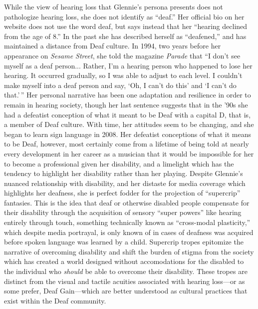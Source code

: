 \documentclass[12pt,letterpaper]{article}
\begin{document}
	While the view of hearing loss that Glennie's persona presents 
	does not pathologize hearing loss, she does not identify as ``deaf.'' 
	Her official bio
	on her website does not use the word deaf, but says instead that her 
	``hearing declined from the age of 8.'' In the past she has described 
	herself as ``deafened,'' and has maintained a distance from Deaf 
	culture. In 1994, two years before her appearance on 
	\textit{Sesame Street}, she told the magazine \textit{Parade} that 
	``I don't see
	myself as a deaf person... Rather, I'm a hearing person who happened to
	lose her hearing. It occurred gradually, so I was able to adjust to 
	each level. I couldn't make myself into a deaf person and say, `Oh, I 
	can't do this' and `I can't do that.'\,'' Her personal narrative has 
	been one adaptation and resilience in order to remain in hearing 
	society, though her last sentence suggests that in the '90s she had a 
	defeatist conception of what it meant to be Deaf with a capital D, 
	that is, a member of Deaf culture. With time, her
	attitudes seem to be changing, and she began to learn sign language in 
	2008.\autocite[186]{Holmes} Her defeatist conceptions of what it means 
	to be Deaf,  
	however, most certainly come from a lifetime of being told at nearly 
	every development in her career as a musician that it would be 
	impossible for her to become a professional given her disability, and
	a limelight which has the tendency to highlight her disability rather 
	than her playing. Despite 
	Glennie's nuanced relationship with disability, and her distaste for 
	media coverage which highlights her deafness, she is perfect fodder for 
	the projection of ``supercrip'' fantasies. This is the idea that deaf 	
	or otherwise disabled people compensate for their disability through the
	acquisition of sensory ``super powers'' like hearing entirely through 
	touch, something technically known as ``cross-modal plasticity,'' which 
	despite media portrayal, is only known of in cases of deafness was 
	acquired before spoken language was learned by a child. Supercrip 
	tropes epitomize the narrative of overcoming 
	disability and shift the burden of stigma from the society which has 
	created a world designed without accomodations for the disabled to the 
	individual
	who \textit{should} be able to overcome their disability. These tropes 
	are distinct from the visual and tactile acuities associated with 
	hearing loss---or as some prefer, Deaf 
	Gain\autocite[174]{Holmes}---which are better understood as cultural 
	practices that exist within the Deaf community.\autocite[181]{Holmes}
\end{document}
